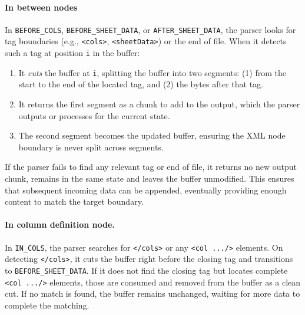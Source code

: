 \paragraph{In between nodes}
In \texttt{BEFORE\_COLS}, \texttt{BEFORE\_SHEET\_DATA}, or \texttt{AFTER\_SHEET\_DATA}, the parser looks for tag boundaries (e.g., \verb|<cols>|, \verb|<sheetData>|) or the end of file. When it detects such a tag at position \verb|i| in the buffer:
\begin{enumerate}
  \item It \emph{cuts} the buffer at \verb|i|, splitting the buffer into two segments:
   (1) from the start to the end of the located tag, and (2) the bytes after that tag.
  \item It returns the first segment as a chunk to add to the output, which the parser outputs or processes for the current state.
  \item The second segment becomes the updated buffer, ensuring the XML node boundary is never split across segments.
\end{enumerate}
If the parser fails to find any relevant tag or end of file, it returns no new output chunk, remains in the same state and leaves the buffer unmodified. This ensures that subsequent incoming data can be appended, eventually providing enough content to match the target boundary.

\paragraph{In column definition node.}
In \texttt{IN\_COLS}, the parser searches for \verb|</cols>| or any \verb|<col .../>| elements. On detecting \verb|</cols>|, it cuts the buffer right before the closing tag and transitions to \texttt{BEFORE\_SHEET\_DATA}. If it does not find the closing tag but locates complete \verb|<col .../>| elements, those are consumed and removed from the buffer as a clean cut. If no match is found, the buffer remains unchanged, waiting for more data to complete the matching.


